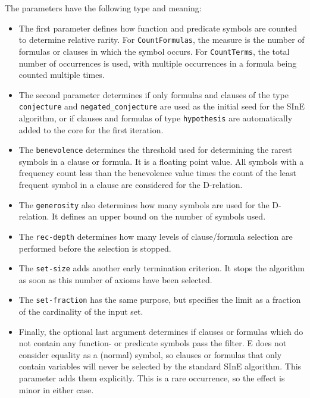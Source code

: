 \documentclass{report}
\begin{document}
The parameters have the following type and meaning:
\begin{itemize}
\item The first parameter defines how function and predicate symbols
  are counted to determine relative rarity. For
  \texttt{CountFormulas}, the measure is the number of formulas or
  clauses in which the symbol occurs. For \texttt{CountTerms}, the
  total number of occurrences is used, with multiple occurrences in a
  formula being counted multiple times.
\item The second parameter determines if only formulas and clauses of
  the type \texttt{conjecture} and \texttt{negated\_conjecture} are
  used as the initial seed for the SInE algorithm, or if clauses and
  formulas of type \texttt{hypothesis} are automatically added to the
  core for the first iteration.
\item The \texttt{benevolence} determines the threshold used for
  determining the rarest symbols in a clause or formula. It is a
  floating point value. All symbols with a frequency count less than
  the benevolence value times the count of the least frequent symbol
  in a clause are considered for the D-relation.
\item The \texttt{generosity} also determines how many symbols are
  used for the D-relation. It defines an upper bound on the number of
  symbols used.
\item The \texttt{rec-depth} determines how many levels of
  clause/formula selection are performed before the selection is
  stopped.
\item The \texttt{set-size} adds another early termination
  criterion. It stops the algorithm as soon as this number of axioms
  have been selected.
\item The \texttt{set-fraction} has the same purpose, but specifies the limit
  as a fraction of the cardinality of the input set.
\item Finally, the optional last argument determines if clauses or
  formulas which do not contain any function- or predicate symbols
  pass the filter. E does not consider equality as a (normal) symbol,
  so clauses or formulas that only contain variables will never be
  selected by the standard SInE algorithm. This parameter adds them
  explicitly. This is a rare occurrence, so the effect is minor in
  either case.
\end{itemize}
\end{document}
